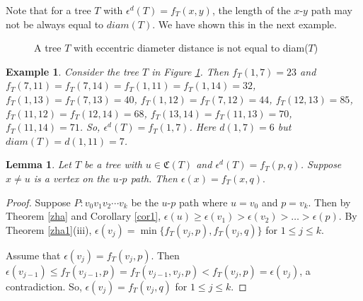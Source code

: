 \documentclass[10pt,a4paper]{amsart}
\newtheorem{lemma}[theorem]{Lemma}
\newtheorem{example}[theorem]{Example}
\begin{document}
Note that for a tree $T$ with $\epsilon^d(T)=f_T(x,y)$,  the length of the $x$-$y$ path may not be always equal to $diam(T)$. We have shown this in the next example.
\begin{figure}[h]
    \centering
\caption{A tree $T$ with eccentric diameter distance is not equal to diam($T$)}\label{fig1}
\end{figure}
\begin{example}
Consider the tree $T$ in Figure \ref{fig1}. Then $f_T(1,7)=23$ and $f_T(7,11)=f_T(7,14)=f_T(1,11)=f_T(1,14)=32$, $f_T(1,13)=f_T(7,13)=40$, $f_T(1,12)=f_T(7,12)=44$, $f_T(12,13)=85$, $f_T(11,12)=f_T(12,14)=68$, $f_T(13,14)=f_T(11,13)=70$, $f_T(11,14)=71$.   So, $\epsilon^d(T)=f_T(1,7)$. Here  $d(1,7)=6$ but $diam(T)=d(1,11)=7$.
\end{example} 
 
\begin{lemma}\label{lem1}
Let $T$ be a tree with $u\in \mathfrak{C}(T)$ and $\epsilon^d(T)=f_T(p,q)$. Suppose $x\neq u$ is a vertex on the $u$-$p$ path. Then $\epsilon(x)=f_T(x,q).$ 
\end{lemma}
\begin{proof}
Suppose $P:v_0v_1v_2\cdots  v_k$ be the $u$-$p$ path where $u=v_0$ and $p=v_k$. Then by Theorem \ref{zha} and Corollary \ref{cor1}, $\epsilon(u)\geq  \epsilon(v_1)>\epsilon(v_2)>\dots >\epsilon(p)$. By Theorem \ref{zha1}(iii), $\epsilon(v_j)=\min\{f_T(v_j,p),f_T(v_j,q)\}$ for $1\leq j \leq k$. 

Assume that $\epsilon(v_j)=f_T(v_j,p)$. Then $\epsilon(v_{j-1})\leq f_T(v_{j-1},p)=f_T(v_{j-1},v_j,p)<f_T(v_j,p)=\epsilon(v_j)$,  a contradiction. So, $\epsilon(v_j)=f_T(v_j,q)$ for $1\leq j \leq k$.
\end{proof}
\end{document}
